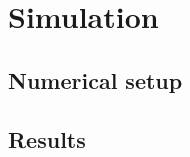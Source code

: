 \documentclass[../main.tex]{subfiles}
\begin{document}
\section{Simulation}
\subsection{Numerical setup}
\subsection{Results}
\end{document}
